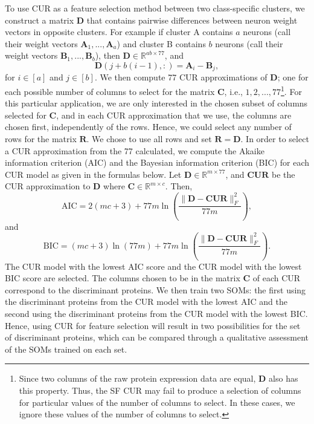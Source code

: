 \documentclass[12pt]{article}
\begin{document}
To use CUR as a feature selection method between two class-specific clusters, we construct a matrix $\mathbf{D}$ that contains pairwise differences between neuron weight vectors in opposite clusters.  For example if cluster A contains $a$ neurons (call their weight vectors $\mathbf{A}_1, ..., \mathbf{A}_a$) and cluster B contains $b$ neurons (call their weight vectors $\mathbf{B}_1, ..., \mathbf{B}_{b}$), then $\mathbf{D} \in \mathbb{R}^{ab \times 77}$, and 
\[
\mathbf{D}(j+b(i-1),:) = \mathbf{A}_{i} - \mathbf{B}_{j},
\]
for $i \in [a]$ and $j \in [b]$.  We then compute 77 CUR approximations of $\mathbf{D}$; one for each possible number of columns to select for the matrix $\mathbf{C}$, i.e., $1,2,...,77$\footnote{Since two columns of the raw protein expression data are equal, $\mathbf{D}$ also has this property.  Thus, the SF CUR may fail to produce a selection of columns for particular values of the number of columns to select.  In these cases, we ignore these values of the number of columns to select.}.  For this particular application, we are only interested in the chosen subset of columns selected for $\mathbf{C}$, and in each CUR approximation that we use, the columns are chosen first, independently of the rows.  Hence, we could select any number of rows for the matrix $\mathbf{R}$. We chose to use all rows and set $\mathbf{R} = \mathbf{D}$.  In order to select a CUR approximation from the 77 calculated, we compute the Akaike information criterion (AIC) \cite{akaike_1973} and the Bayesian information criterion (BIC) \cite{schwarz_1978} for each CUR model as given in the formulas below.  Let $\mathbf{D} \in \mathbb{R}^{m \times 77}$, and $\mathbf{CUR}$ be the CUR approximation to $\mathbf{D}$ where $\mathbf{C} \in \mathbb{R}^{m \times c}$.  Then,
\[
\text{AIC} = 2(mc+3) + 77m \ln \left( \frac{\| \mathbf{D} - \mathbf{CUR} \|_F^2}{77m} \right), 
\]
and
\[
\text{BIC} = (mc+3) \ln (77m) + 77m \ln \left( \frac{\| \mathbf{D} - \mathbf{CUR} \|_F^2}{77m} \right). 
\]
The CUR model with the lowest AIC score and the CUR model with the lowest BIC score are selected.  The columns chosen to be in the matrix $\mathbf{C}$ of each CUR correspond to the discriminant proteins.  We then train two SOMs: the first using the discriminant proteins from the CUR model with the lowest AIC and the second using the discriminant proteins from the CUR model with the lowest BIC.  Hence, using CUR for feature selection will result in two possibilities for the set of discriminant proteins, which can be compared through a qualitative assessment of the SOMs trained on each set.  
\end{document}
